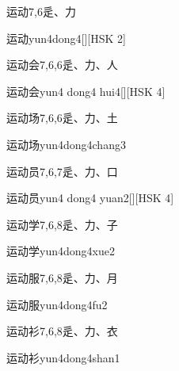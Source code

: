 \begin{entry}{运动}{7,6}{⾡、⼒}
  \begin{phonetics}{运动}{yun4dong4}[][HSK 2]
  \end{phonetics}
\end{entry}

\begin{entry}{运动会}{7,6,6}{⾡、⼒、⼈}
  \begin{phonetics}{运动会}{yun4 dong4 hui4}[][HSK 4]
  \end{phonetics}
\end{entry}

\begin{entry}{运动场}{7,6,6}{⾡、⼒、⼟}
  \begin{phonetics}{运动场}{yun4dong4chang3}
  \end{phonetics}
\end{entry}

\begin{entry}{运动员}{7,6,7}{⾡、⼒、⼝}
  \begin{phonetics}{运动员}{yun4 dong4 yuan2}[][HSK 4]
  \end{phonetics}
\end{entry}

\begin{entry}{运动学}{7,6,8}{⾡、⼒、⼦}
  \begin{phonetics}{运动学}{yun4dong4xue2}
  \end{phonetics}
\end{entry}

\begin{entry}{运动服}{7,6,8}{⾡、⼒、⽉}
  \begin{phonetics}{运动服}{yun4dong4fu2}
  \end{phonetics}
\end{entry}

\begin{entry}{运动衫}{7,6,8}{⾡、⼒、⾐}
  \begin{phonetics}{运动衫}{yun4dong4shan1}
  \end{phonetics}
\end{entry}

